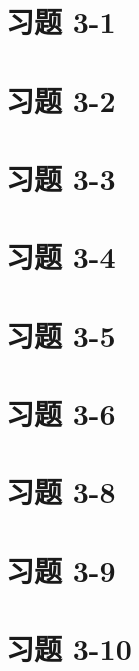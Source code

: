 \documentclass[UTF8,12pt,a4paper]{ctexart} %
\begin{document}
\section*{习题 3-1}



\section*{习题 3-2}



\section*{习题 3-3}



\section*{习题 3-4}



\section*{习题 3-5}



\section*{习题 3-6}

\section*{习题 3-8}



\section*{习题 3-9}

\section*{习题 3-10}
\end{document}
